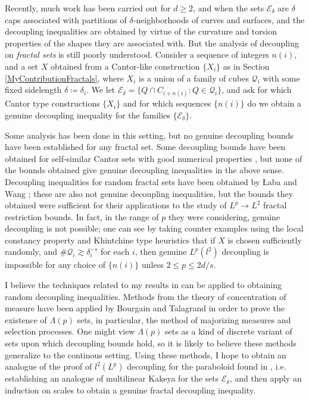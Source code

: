 \documentclass[11pt]{article}
\begin{document}
Recently, much work has been carried out for $d \geq 2$, and when the sets $\mathcal{E}_\delta$ are $\delta$ caps associated with partitions of $\delta$-neighborhoods of curves and surfaces, and the decoupling inequalities are obtained by virtue of the curvature and torsion properties of the shapes they are associated with. But the analysis of decoupling on \emph{fractal sets} is still poorly understood. %
Consider a sequence of integers $n(i)$, and a set $X$ obtained from a Cantor-like construction $\{ X_i \}$ as in Section \ref{MyContributionFractals}, where $X_i$ is a union of a family of cubes $\mathcal{Q}_i$ with some fixed sidelength $\delta \coloneqq \delta_i$. We let $\mathcal{E}_\delta = \{ Q \cap C_{i + n(i)} : Q \in \mathcal{Q}_i \}$, and ask for which Cantor type constructions $\{ X_i \}$ and for which sequences $\{ n(i) \}$ do we obtain a genuine decoupling inequality for the families $\{ \mathcal{E}_\delta \}$.

Some analysis has been done in this setting, but no genuine decoupling bounds have been established for any fractal set. Some decoupling bounds have been obtained for self-similar Cantor sets with good numerical properties \cite{ChangJaumeGreenfeldJamneshanLiMadrid}, but none of the bounds obtained give genuine decoupling inequalities in the above sense. Decoupling inequalities for random fractal sets have been obtained by {\L}aba and Wang \cite{LabaWang}; these are also not genuine decoupling inequalities, but the bounds they obtained were sufficient for their applications to the study of $L^p \to L^2$ fractal restriction bounds. In fact, in the range of $p$ they were considering, genuine decoupling is not possible; one can see by taking counter examples using the local constancy property and Khintchine type heuristics that if $X$ is chosen sufficiently randomly, and $\# \mathcal{Q}_i \gtrsim \delta_i^{-s}$ for each $i$, then genuine $L^p(l^2)$ decoupling is impossible for any choice of $\{ n(i) \}$ unless $2 \leq p \leq 2d/s$.

I believe the techniques related to my results in \cite{DensonFourier} can be applied to obtaining random decoupling inequalities. Methods from the theory of concentration of measure have been applied by Bourgain \cite{Bourgain} and Talagrand \cite{Talagrand} in order to prove the existence of $\Lambda(p)$ sets, in particular, the method of majorizing measures and selection processes. One might view $\Lambda(p)$ sets as a kind of discrete variant of sets upon which decoupling bounds hold, so it is likely to believe these methods generalize to the continous setting. Using these methods, I hope to obtain an analogue of the proof of $l^2(L^p)$ decoupling for the paraboloid found in \cite{BourgainDemeterStudyGuide}, i.e. establishing an analogue of multilinear Kakeya for the sets $\mathcal{E}_\delta$, and then apply an induction on scales to obtain a genuine fractal decoupling inequality.
\end{document}
